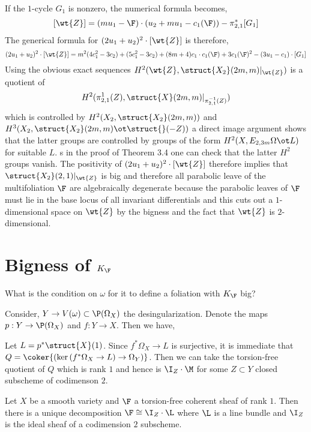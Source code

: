 \documentclass[12pt]{article}
\begin{document}
If the $1$-cycle $G_1$ is nonzero, the numerical formula becomes,
\[ [\wt{Z}] = (m u_1 - \F) \cdot (u_2 + m u_1 - c_1(\F)) - \pi_{2,1}^* [G_1] \]
The generical formula for $(2 u_1 + u_2)^2 \cdot [\wt{Z}]$ is therefore,
\[ (2 u_1 + u_2)^2 \cdot [\wt{Z}] = m^2 (4 c_1^2 - 3 c_2) + (5 c_1^2 - 3 c_2) + (8m + 4) c_1 \cdot c_1(\F) + 3 c_1(\F)^2 - (3 u_1 - c_1) \cdot [G_1] \]
Using the obvious exact sequences $H^2(\wt{Z}, \struct{X_2}(2m, m)|_{\wt{Z}})$ is a quotient of
\[ H^2( \pi_{2,1}^{1}(Z), \struct{X}(2m,m) |_{\pi_{2,1}^{-1}(Z)}) \]
which is controlled by $H^2(X_2, \struct{X_2}(2m,m))$ and $H^3(X_2, \struct{X_2}(2m,m) \ot \struct{}(-Z))$ a direct image argument shows that the latter groups are controlled by groups of the form $H^2(X, E_{2,3m} \Omega \ot L)$ for suitable $L$. s in the proof of Theorem 3.4 one can check that the latter $H^2$ groups vanish. The positivity of $(2 u_1 + u_2)^2 \cdot [\wt{Z}]$ therefore implies that $\struct{X_2}(2,1)|_{\wt{Z}}$ is big and therefore all parabolic leave of the multifoliation $\F$ are algebraically degenerate because the parabolic leaves of $\F$ must lie in the base locus of all invariant differentials and this cuts out a $1$-dimensional space on $\wt{Z}$ by the bigness and the fact that $\wt{Z}$ is $2$-dimensional.



\section{Bigness of $K_\F$}

What is the condition on $\omega$ for it to define a foliation with $K_\F$ big?

Consider, $Y \to V(\omega) \subset \P(\Omega_X)$ the desingularization. Denote the maps $p : Y \to \P(\Omega_X)$ and $f : Y \to X$. Then we have,
\begin{center}
\end{center}
Let $L = p^* \struct{X}(1)$.
Since $f^* \Omega_X \to L$ is surjective, it is immediate that $Q = \coker{(\ker{(f^* \Omega_X \to L)} \to \Omega_Y)}$.
Then we can take the torsion-free quotient of $Q$ which is rank $1$ and hence is $\I_Z \cdot \M$ for some $Z \subset Y$ closed subscheme of codimenson $2$. 

\begin{lemma}
Let $X$ be a smooth variety and $\F$ a torsion-free coherent sheaf of rank $1$. Then there is a unique decomposition $\F \cong \I_Z \cdot \L$ where $\L$ is a line bundle and $\I_Z$ is the ideal sheaf of a codimension $2$ subscheme.
\end{lemma}
\end{document}
